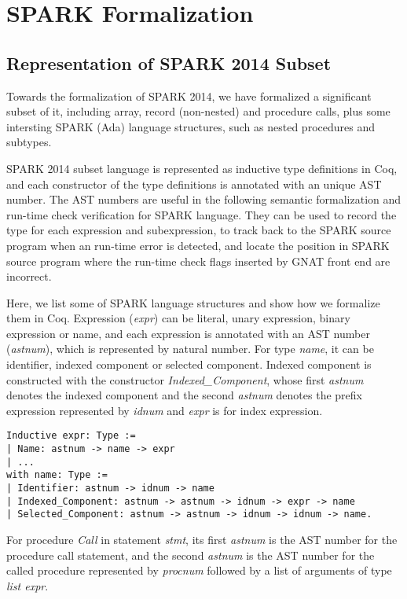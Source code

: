 \section{SPARK Formalization}
\subsection{Representation of SPARK 2014 Subset}
Towards the formalization of SPARK 2014, we have formalized a significant subset
of it, including array, record (non-nested) and procedure calls, plus some
intersting SPARK (Ada) language structures, such as nested procedures and
subtypes.

SPARK 2014 subset language is represented as inductive type definitions in Coq,
and each constructor of the type definitions is annotated with an unique AST
number. The AST numbers are useful in the following semantic formalization and
run-time check verification for SPARK language. They can be used to record the
type for each expression and subexpression, to track back to the SPARK source
program when an run-time error is detected, and locate the position in
SPARK source program where the run-time check flags inserted by GNAT front end
are incorrect.

Here, we list some of SPARK language structures and show how we formalize them
in Coq. Expression (\textit{expr}) can be literal, unary expression, binary
expression or name, and each expression is annotated with an AST number
(\textit{astnum}), which is represented by natural number. For type
\textit{name}, it can be identifier, indexed component or selected component.
Indexed component is constructed with the constructor
\textit{Indexed\_Component}, whose first \textit{astnum} denotes the indexed
component and the second \textit{astnum} denotes the prefix expression
represented by \textit{idnum} and \textit{expr} is for index expression. 

\begin{lstlisting}[escapechar=\#, language=coq, basicstyle=\small]
Inductive expr: Type := 
| Name: astnum -> name -> expr 
| ...
with name: Type := 
| Identifier: astnum -> idnum -> name 
| Indexed_Component: astnum -> astnum -> idnum -> expr -> name 
| Selected_Component: astnum -> astnum -> idnum -> idnum -> name.
\end{lstlisting}

For procedure \textit{Call} in statement \textit{stmt}, its first
\textit{astnum} is the AST number for the procedure call statement, and the
second \textit{astnum} is the AST number for the called procedure represented by 
\textit{procnum} followed by a list of arguments of type \textit{list expr}.

